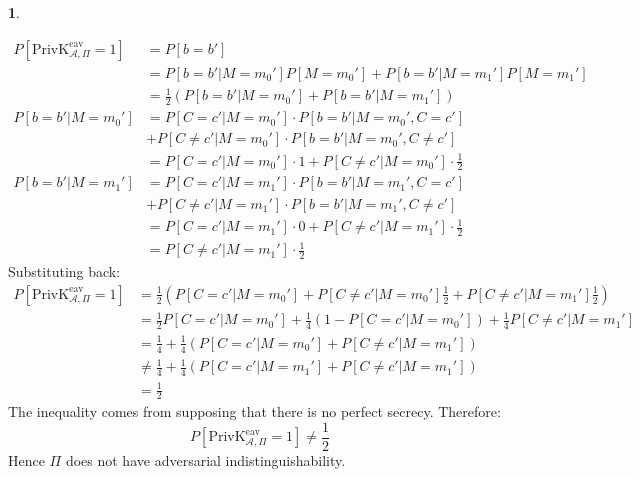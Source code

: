 \documentclass{article}
\theoremstyle{definition}
\newcommand{\priveav}{\text{PrivK}_{\mathcal{A},\Pi}^\text{eav}}
\theoremstyle{definition}
\theoremstyle{definition}
\newtheorem{solution-internal}{}[subsection]
\newenvironment{solution}{
  \begin{solution-internal}
}{
  \end{solution-internal}
}
\begin{document}
\begin{solution}
\begin{item}
      \begin{align*}
        P[\priveav = 1] &= P[b=b']\\
                        &= P[b=b'|M=m_0']P[M=m_0'] + P[b=b'|M=m_1']P[M=m_1'] \\
                        &= \frac{1}{2}\left(P[b=b'|M=m_0'] + P[b=b'|M=m_1'] \right) \\
        P[b=b'|M=m_0'] &= P[C=c'|M=m_0']\cdot P[b=b'|M=m_0',C=c']\\
                       &+ P[C\neq c'|M=m_0']\cdot P[b=b'|M=m_0', C\neq c'] \\
        &= P[C=c'|M=m_0']\cdot 1 + P[C\neq c'|M=m_0']\cdot \frac{1}{2} \\
        P[b=b'|M=m_1'] &= P[C=c'|M=m_1']\cdot P[b=b'|M=m_1',C=c']\\
                       &+ P[C\neq c'|M=m_1']\cdot P[b=b'|M=m_1', C\neq c'] \\
        &= P[C=c'|M=m_1']\cdot 0 + P[C\neq c'|M=m_1']\cdot \frac{1}{2} \\
        &= P[C\neq c'|M=m_1']\cdot \frac{1}{2}
      \end{align*}
    Substituting back:
      \begin{align*}
        P[\priveav = 1] &= \frac{1}{2}\left( P[C=c'|M=m_0'] + P[C\neq c'|M=m_0'] \frac{1}{2} + P[C\neq c'|M=m_1'] \frac{1}{2}\right )  \\
                        &= \frac{1}{2} P[C=c'|M=m_0'] + \frac{1}{4}\left(1 - P[C
      = c'|M=m_0']\right) + \frac{1}{4} P[C\neq c'|M=m_1'] \\
                        &= \frac{1}{4} + \frac{1}{4}\left(P[C=c'|M=m_0'] +  P[C\neq c'|M=m_1'] \right) \\
                        &\neq \frac{1}{4} + \frac{1}{4}\left(P[C=c'|M=m_1'] +  P[C\neq c'|M=m_1'] \right) \\
                        &=\frac{1}{2}
          \end{align*}
      The inequality comes from supposing that there is no perfect secrecy.
      Therefore:
      \[ P[\priveav = 1] \neq \frac{1}{2} \]
      Hence $\Pi$ does not have adversarial indistinguishability.
  \end{item}
\end{solution}
\end{document}
